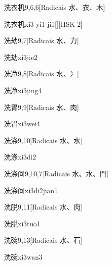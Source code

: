 \begin{entry}{洗衣机}{9,6,6}[Radicais ⽔、⾐、⽊]
  \begin{phonetics}{洗衣机}{xi3 yi1 ji1}[][HSK 2]
  \end{phonetics}
\end{entry}

\begin{entry}{洗劫}{9,7}[Radicais ⽔、⼒]
  \begin{phonetics}{洗劫}{xi3jie2}
  \end{phonetics}
\end{entry}

\begin{entry}{洗净}{9,8}[Radicais ⽔、⼎]
  \begin{phonetics}{洗净}{xi3jing4}
  \end{phonetics}
\end{entry}

\begin{entry}{洗胃}{9,9}[Radicais ⽔、⾁]
  \begin{phonetics}{洗胃}{xi3wei4}
  \end{phonetics}
\end{entry}

\begin{entry}{洗涤}{9,10}[Radicais ⽔、⽔]
  \begin{phonetics}{洗涤}{xi3di2}
  \end{phonetics}
\end{entry}

\begin{entry}{洗涤间}{9,10,7}[Radicais ⽔、⽔、⾨]
  \begin{phonetics}{洗涤间}{xi3di2jian1}
  \end{phonetics}
\end{entry}

\begin{entry}{洗脱}{9,11}[Radicais ⽔、⾁]
  \begin{phonetics}{洗脱}{xi3tuo1}
  \end{phonetics}
\end{entry}

\begin{entry}{洗碗}{9,13}[Radicais ⽔、⽯]
  \begin{phonetics}{洗碗}{xi3wan3}
  \end{phonetics}
\end{entry}


